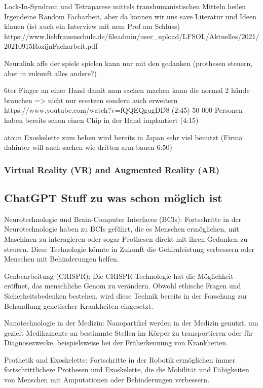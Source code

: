 \documentclass[a4paper,
DIV=13,
12pt,
BCOR=10mm,
department=FakEI,
twoside,
parskip=half,
automark,
]{OTHRartcl}
\begin{document}
Lock-In-Syndrom und Tetraparese mittels transhumanistischen Mitteln heilen
Irgendeine Random Facharbeit, aber da können wir uns save Literatur und Ideen klauen (ist auch ein Interview mit nem Prof am Schluss)
https://www.liebfrauenschule.de/fileadmin/user_upload/LFSOL/Aktuelles/2021/20210915RozijnFacharbeit.pdf

Neuralink affe der spiele spielen kann nur mit den gedanken (prothesen steuern, aber in zukunft alles andere?)

6ter Finger an einer Hand damit man sachen machen kann die normal 2 hände brauchen => nicht nur ersetzen sondern auch erweitern
https://www.youtube.com/watch?v=fQQEQgugDD8 (2:45)
50 000 Personen haben bereits schon einen Chip in der Hand implantiert (4:15)

atoun Exoskelette zum heben wird bereits in Japan sehr viel benutzt (Firma dahinter will auch sachen wie dritten arm bauen 6:50)
\subsubsection*{Virtual Reality (VR) and Augmented Reality (AR)}

\subsection*{ChatGPT Stuff zu was schon möglich ist}

Neurotechnologie und Brain-Computer Interfaces (BCIs): Fortschritte in der Neurotechnologie haben zu BCIs geführt, die es Menschen ermöglichen, mit Maschinen zu interagieren oder sogar Prothesen direkt mit ihren Gedanken zu steuern. Diese Technologie könnte in Zukunft die Gehirnleistung verbessern oder Menschen mit Behinderungen helfen.

Genbearbeitung (CRISPR): Die CRISPR-Technologie hat die Möglichkeit eröffnet, das menschliche Genom zu verändern. Obwohl ethische Fragen und Sicherheitsbedenken bestehen, wird diese Technik bereits in der Forschung zur Behandlung genetischer Krankheiten eingesetzt.

Nanotechnologie in der Medizin: Nanopartikel werden in der Medizin genutzt, um gezielt Medikamente an bestimmte Stellen im Körper zu transportieren oder für Diagnosezwecke, beispielsweise bei der Früherkennung von Krankheiten.

Prothetik und Exoskelette: Fortschritte in der Robotik ermöglichen immer fortschrittlichere Prothesen und Exoskelette, die die Mobilität und Fähigkeiten von Menschen mit Amputationen oder Behinderungen verbessern.
\end{document}
